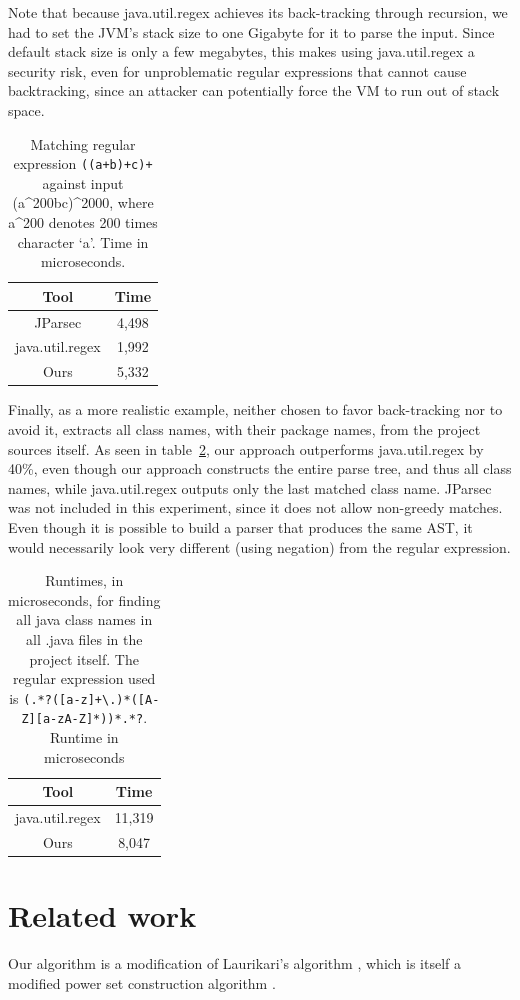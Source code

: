 \documentclass[english,twocolumn]{article}
\theoremstyle{definition}
\newcommand{\Tabref}[1]{table~\ref{tab:#1}}
\newcommand{\seclabel}[1]{\label{sec:#1}}
\newcommand{\tablabel}[1]{\label{tab:#1}}
\begin{document}
Note that because java.util.regex achieves its back-tracking through recursion,
we had to set the JVM's stack size to one Gigabyte for it to parse the input.
Since default stack size is only a few megabytes, this makes using
java.util.regex a security risk, even for unproblematic regular expressions
that cannot cause backtracking, since an attacker can potentially force the VM to run 
out of stack space.

\begin{table}[htp]
\begin{tabular}{cc}
\toprule
Tool & Time\tabularnewline
\midrule
JParsec & 4,498\tabularnewline
java.util.regex & 1,992\tabularnewline
Ours & 5,332\tabularnewline
\bottomrule
\end{tabular}
\caption{Matching regular expression \texttt{((a+b)+c)+} against input (a\^{}200bc)\^{}2000, where a\^{}200 denotes 200 times character `a'. Time in microseconds.}
\tablabel{abc}
\end{table}

Finally, as a more realistic example, neither chosen to favor
back-tracking nor to avoid it,  extracts all class names, with their
package names, from the project sources itself.  As seen in
\Tabref{real}, our approach outperforms java.util.regex by 40\%,
even though our approach constructs the entire parse tree, and thus
all class names, while java.util.regex outputs only the last matched
class name. JParsec was not included in this experiment, since it does 
not allow non-greedy matches. Even though it is possible to build
a parser that produces the same AST, it would necessarily look very
different (using negation) from the regular expression.

\begin{table}[htp]
\begin{tabular}{cc}
\toprule
Tool & Time\tabularnewline
\midrule
java.util.regex & 11,319\tabularnewline
Ours & 8,047\tabularnewline
\bottomrule
\end{tabular}
\caption{Runtimes, in microseconds, for finding all java class names in all .java files in the project itself. The regular expression used is 
\texttt{(.*?([a-z]+\textbackslash.)*([A-Z][a-zA-Z]*))*.*?}.
Runtime in microseconds}
\tablabel{real}
\end{table}


\section{Related work}
\seclabel{related}
Our algorithm is a modification of Laurikari's algorithm \cite{Laur00a},
which is itself a modified power set construction algorithm \cite[p. 55]{Sips05a}.
\end{document}
